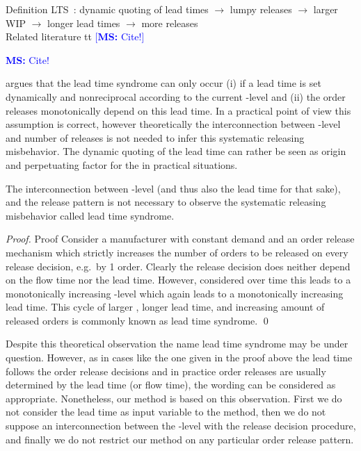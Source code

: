 \documentclass[mnsc]{informs3}
\newcommand\MS[2][r]{\ifx t#1 \textcolor{blue}{[\textbf{MS:} #2]}
  \else \begin{center}\textcolor{blue}{\textbf{MS:} #2} \end{center} \fi}
\begin{document}
Definition LTS~\citep{selccuk2013adaptive}: dynamic quoting of lead times $\rightarrow$ lumpy releases $\rightarrow$ larger
WIP $\rightarrow$ longer lead times $\rightarrow$ more releases\\


Related literature \MS[t]{Cite!} argues that the lead time syndrome can only occur (i) if a lead
time is set dynamically and nonreciprocal according to the current \WIP{}-level and (ii) the order
releases monotonically depend on this lead time. In a practical point of view this assumption is
correct, however theoretically the interconnection between \WIP{}-level and number of releases is
not needed to infer this systematic releasing misbehavior. The dynamic quoting of the lead time can
rather be seen as origin and perpetuating factor for the \LTS{} in practical situations.

\begin{lemma}
  The interconnection between \WIP{}-level (and thus also the lead time for that sake), and the
  release pattern is not necessary to observe the systematic releasing misbehavior called lead time
  syndrome.
\end{lemma}

\begin{proof}{Proof}
  Consider a manufacturer with constant demand and an order release mechanism which strictly
  increases the number of orders to be released on every release decision, e.g.~by 1 order. Clearly
  the release decision does neither depend on the flow time nor the lead time. However, considered
  over time this leads to a monotonically increasing \WIP{}-level which again leads to a
  monotonically increasing lead time. This cycle of larger \WIP{}, longer lead time, and increasing
  amount of released orders is commonly known as lead time syndrome. \qed
\end{proof}

Despite this theoretical observation the name lead time syndrome may be under question. However, as
in cases like the one given in the proof above the lead time follows the order release decisions and
in practice order releases are usually determined by the lead time (or flow time), the wording can
be considered as appropriate.
%
Nonetheless, our method is based on this observation. First we do not consider the lead time as
input variable to the method, then we do not suppose an interconnection between the \WIP{}-level
with the release decision procedure, and finally we do not restrict our method on any particular
order release pattern.
\end{document}
